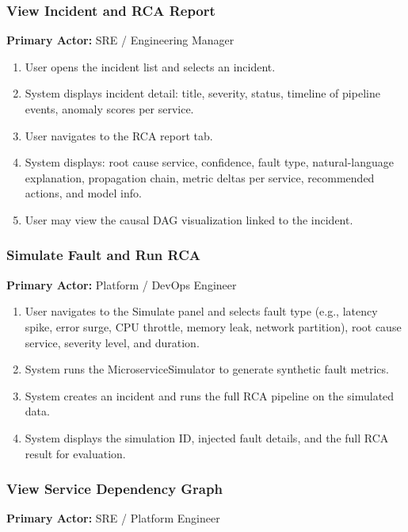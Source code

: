 \documentclass[11pt,a4paper]{article}
\begin{document}
\subsubsection{View Incident and RCA Report}

\textbf{Primary Actor:} SRE / Engineering Manager

\begin{enumerate}
    \item User opens the incident list and selects an incident.
    \item System displays incident detail: title, severity, status, timeline of pipeline events, anomaly scores per service.
    \item User navigates to the RCA report tab.
    \item System displays: root cause service, confidence, fault type, natural-language explanation, propagation chain, metric deltas per service, recommended actions, and model info.
    \item User may view the causal DAG visualization linked to the incident.
\end{enumerate}

\subsubsection{Simulate Fault and Run RCA}

\textbf{Primary Actor:} Platform / DevOps Engineer

\begin{enumerate}
    \item User navigates to the Simulate panel and selects fault type (e.g., latency spike, error surge, CPU throttle, memory leak, network partition), root cause service, severity level, and duration.
    \item System runs the MicroserviceSimulator to generate synthetic fault metrics.
    \item System creates an incident and runs the full RCA pipeline on the simulated data.
    \item System displays the simulation ID, injected fault details, and the full RCA result for evaluation.
\end{enumerate}

\subsubsection{View Service Dependency Graph}

\textbf{Primary Actor:} SRE / Platform Engineer
\end{document}
